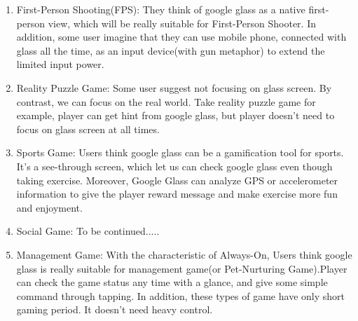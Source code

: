 \begin{enumerate}
\item First-Person Shooting(FPS): They think of google glass as a native first-person view, which will be really suitable for First-Person Shooter. In addition, some user imagine that they can use mobile phone, connected with glass all the time, as an input device(with gun metaphor) to extend the limited input power.

\item Reality Puzzle Game: Some user suggest not focusing on glass screen. By contrast, we can focus on the real world. Take reality puzzle game for example, player can get hint from google glass, but player doesn't need to focus on glass screen at all times. 

\item Sports Game: Users think google glass can be a gamification tool for sports. It's a see-through screen, which let us can check google glass even though taking exercise. Moreover, Google Glass can analyze GPS or accelerometer information to give the player reward message and make exercise more fun and enjoyment.

\item Social Game: To be continued.....

\item Management Game: With the characteristic of Always-On, Users think google glass is really suitable for management game(or Pet-Nurturing Game).Player can check the game status any time with a glance, and give some simple command through tapping. In addition, these types of game have only short gaming period. It doesn't need heavy control.

\end{enumerate}




